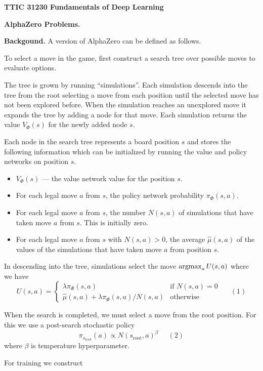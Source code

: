 \documentclass{article}
\begin{document}
\centerline{\bf TTIC 31230 Fundamentals of Deep Learning}
\bigskip
\centerline{\bf AlphaZero Problems.}

\bigskip
\bigskip
{\bf Backgound.}
A version of AlphaZero can be defined as follows.

\medskip
To select a move in the game, first construct a search tree over possible moves to evaluate options.

\medskip
The tree is grown by running ``simulations''.  Each simulation descends into the tree from the root selecting a move from each position
until the selected move has not been explored before.  When the simulation reaches an unexplored move it expands the tree by adding a node for that move.
Each simulation returns the value $V_\Phi(s)$ for the newly added node $s$.

\medskip
Each node in the search tree represents a board position $s$ and stores the following information which can be initialized
by running the value and policy networks on position $s$.

\begin{itemize}
\item $V_\Phi(s)$ --- the value network value for the position $s$.
\item For each legal move $a$ from $s$, the policy network probability $\pi_\Phi(s,a)$.
\item For each legal move $a$ from $s$, the number $N(s,a)$ of simulations that have taken move $a$ from $s$. This is initially zero.
\item For each legal move $a$ from $s$ with $N(s,a) > 0$, the average $\hat{\mu}(s,a)$ of the values of the simulations that have
  taken move $a$ from position $s$.
\end{itemize}

\medskip
In descending into the tree, simulations select the move $\operatorname*{argmax}_a U(s,a)$ where we have
$$U(s,a) =  \left\{\begin{array}{ll}\lambda \pi_\Phi(s,a) &\mbox{if $N(s,a) = 0$} \\ \hat{\mu}(s,a) + \lambda \pi_\Phi(s,a)/N(s,a) & \mbox{otherwise} \end{array}\right.\;\;\;\;\;(1)$$

\medskip
When the search is completed, we must select a move from the root position.  For this we use a post-search stochastic policy
$$\pi_{s_{\mathrm{root}}}(a) \propto N(s_{\mathrm{root}},a)^\beta\;\;\;\;\;(2)$$
where $\beta$ is temperature hyperparameter.

\medskip
For training we construct
\end{document}
